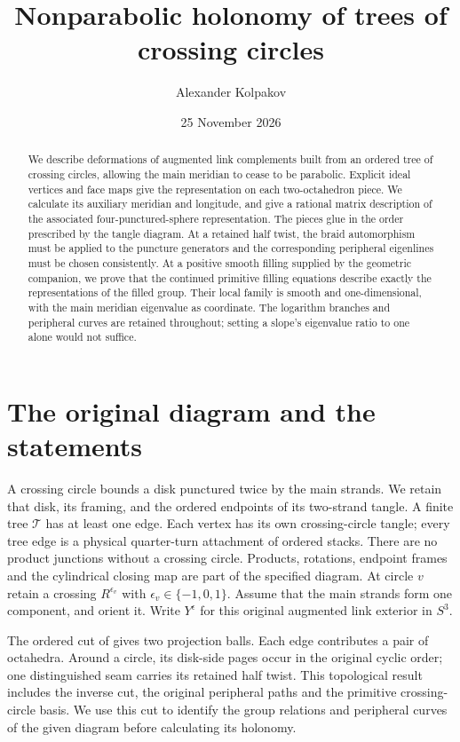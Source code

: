 \documentclass[11pt]{article}
\title{Nonparabolic holonomy of trees of crossing circles}
\author{Alexander Kolpakov}\date{25 November 2026}
\numberwithin{equation}{section}
\theoremstyle{definition}\newtheorem{definition}[theorem]{Definition}
\theoremstyle{remark}\newtheorem{remark}[theorem]{Remark}
\begin{document}
\maketitle
\begin{abstract}
We describe deformations of augmented link complements built from an
ordered tree of crossing circles, allowing the main meridian to cease
to be parabolic. Explicit ideal vertices and face maps give the
representation on each two-octahedron piece. We calculate its auxiliary
meridian and longitude, and give a rational matrix description of the
associated four-punctured-sphere representation. The pieces glue in
the order prescribed by the tangle diagram. At a retained half twist,
the braid automorphism must be applied to the puncture generators and
the corresponding peripheral eigenlines must be chosen consistently.
At a positive smooth filling supplied by the geometric companion, we
prove that the continued primitive filling equations describe exactly
the representations of the filled group. Their local family is smooth
and one-dimensional, with the main meridian eigenvalue as coordinate.
The logarithm branches and peripheral curves are retained throughout;
setting a slope's eigenvalue ratio to one alone would not suffice.
\end{abstract}

\section{The original diagram and the statements}\label{ng:introduction}

A crossing circle bounds a disk punctured twice by the main strands.
We retain that disk, its framing, and the ordered endpoints of its
two-strand tangle. A finite tree $\mathcal T$ has at least one edge.
Each vertex has its own crossing-circle tangle; every tree edge is a
physical quarter-turn attachment of ordered stacks. There are no
product junctions without a crossing circle. Products, rotations,
endpoint frames and the cylindrical closing map are part of the
specified diagram. At circle $v$ retain a crossing
$R^{\epsilon_v}$ with $\epsilon_v\in\{-1,0,1\}$.
Assume that the main strands form one component, and orient it.
Write $Y^\epsilon$ for this original augmented link exterior in $S^3$.

The ordered cut of \cite[Proposition~2.1]{Circle} gives two projection
balls. Each edge contributes a pair of octahedra. Around a circle,
its disk-side pages occur in the original cyclic order; one
distinguished seam carries its retained half twist. This topological
result includes the inverse cut, the original peripheral paths and
the primitive crossing-circle basis. We use this cut to identify the group relations and peripheral
curves of the given diagram before calculating its holonomy.
\end{document}
